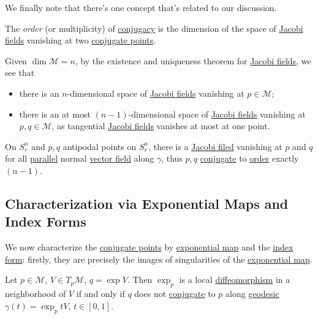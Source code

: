 We finally note that there's one concept that's related to our discussion.

\begin{definition}[Order]\label{def:order}
	The \emph{order} (or multiplicity) of \hyperref[def:conjugate-point]{conjugacy} is the dimension of the space of \hyperref[def:Jacobi-field]{Jacobi fields} vanishing at two \hyperref[def:conjugate-point]{conjugate points}.
\end{definition}

Given \(\dim \mathcal{M} = n\), by the existence and uniqueness theorem for \hyperref[def:Jacobi-field]{Jacobi fields}, we see that
\begin{itemize}
	\item there is an \(n\)-dimensional space of \hyperref[def:Jacobi-field]{Jacobi fields} vanishing at \(p\in \mathcal{M} \);
	\item there is an at most \((n-1)\)-dimensional space of \hyperref[def:Jacobi-field]{Jacobi fields} vanishing at \(p, q\in \mathcal{M} \), as tangential \hyperref[def:Jacobi-field]{Jacobi fields} vanishes at most at one point.
\end{itemize}

\begin{eg}[\(S^n_r\)]
	On \(S^n_r\) and \(p, q\) antipodal points on \(S^n_r\), there is a \hyperref[def:Jacobi-field]{Jacobi filed} vanishing at \(p\) and \(q\) for all \hyperref[def:parallel]{parallel} normal \hyperref[def:vector-field]{vector field} along \(\gamma \), thus \(p, q\) \hyperref[def:conjugate-point]{conjugate} to \hyperref[def:order]{order} exactly \((n-1)\).
	\begin{center}
	\end{center}
\end{eg}
\subsection{Characterization via Exponential Maps and Index Forms}
We now characterize the \hyperref[def:conjugate-point]{conjugate points} by \hyperref[def:exponential-map]{exponential map} and the \hyperref[def:index-form]{index form}: firstly, they are precisely the images of singularities of the \hyperref[def:exponential-map]{exponential map}.

\begin{proposition}
	Let \(p\in \mathcal{M} \), \(V\in T_p \mathcal{M} \), \(q = \exp V\). Then \(\exp _p\) is a local \hyperref[def:diffeomorphism]{diffeomorphism} in a neighborhood of \(V\) if and only if \(q\) does not \hyperref[def:conjugate-point]{conjugate} to \(p\) along \hyperref[def:geodesic]{geodesic} \(\gamma (t) = \exp _p tV\), \(t\in [0, 1]\).
\end{proposition}

